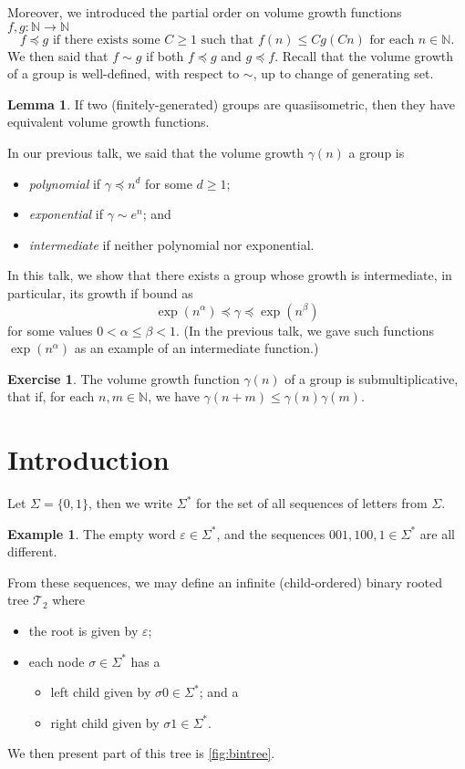 \documentclass[11pt,a4paper,reqno]{amsart}
\theoremstyle{plain}
\theoremstyle{definition}
\newtheorem{lemma}[theorem]{Lemma}
\theoremstyle{definition}
\newtheorem{exercise}[theorem]{Exercise}
\newtheorem{example}[theorem]{Example}
\renewcommand\leq\leqslant
\renewcommand\geq\geqslant
\begin{document}
Moreover, we introduced the partial order on volume growth functions $f,g\colon \mathbb N \to \mathbb N$
\[
  f\preccurlyeq g
  \text{ if there exists some }
  C\geq 1
  \text{ such that }
  f(n) \leq Cg(Cn)
  \text{ for each }n\in \mathbb N.
\]
We then said that $f\sim g$ if both $f \preccurlyeq g$ and $g \preccurlyeq f$.
Recall that the volume growth of a group is well-defined, with respect to $\sim$, up to change of generating set.

\begin{lemma}If two (finitely-generated) groups are quasiisometric, then they have equivalent volume growth functions.\end{lemma}


In our previous talk, we said that the volume growth $\gamma(n)$ a group is
\begin{itemize}
  \item \emph{polynomial} if $\gamma \preccurlyeq n^d$ for some $d\geq 1$;
  \item \emph{exponential} if $\gamma \sim e^n$; and
  \item \emph{intermediate} if neither polynomial nor exponential.
\end{itemize}
In this talk, we show that there exists a group whose growth is intermediate, in particular, its growth if bound as
\[
  \exp(n^\alpha) \preccurlyeq \gamma \preccurlyeq \exp(n^\beta)
\]
for some values $0<\alpha\leq \beta< 1$.
(In the previous talk, we gave such functions $\exp(n^\alpha)$ as an example of an intermediate function.)


\begin{exercise}\label{ex:submulti}
  The volume growth function $\gamma(n)$ of a group is submultiplicative, that if, for each $n,m\in \mathbb N$, we have $\gamma(n+m) \leq \gamma(n)\gamma(m)$.
\end{exercise}

\section{Introduction}

Let $\Sigma = \{0,1\}$, then we write $\Sigma^*$ for the set of all sequences of letters from $\Sigma$.

\begin{example}
  The empty word $\varepsilon \in \Sigma^*$, and the sequences $001,100,1\in \Sigma^*$ are all different.
\end{example}

From these sequences, we may define an infinite (child-ordered) binary rooted tree $\mathcal T_2$ where
\begin{itemize}
  \item the root is given by $\varepsilon$;
  \item each node $\sigma\in \Sigma^*$ has a
    \begin{itemize}
      \item left child given by $\sigma 0 \in \Sigma^*$; and a
      \item right child given by $\sigma 1 \in \Sigma^*$.
    \end{itemize}
\end{itemize}
We then present part of this tree is \cref{fig:bintree}.
\end{document}
